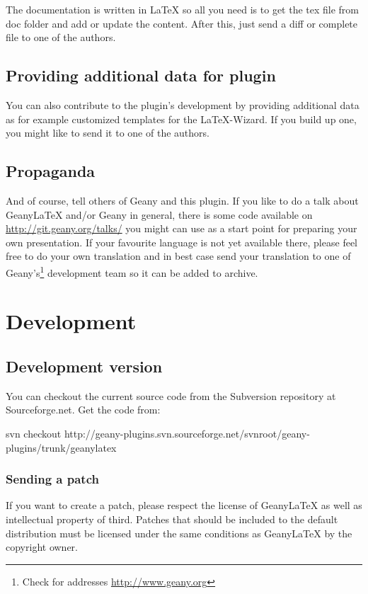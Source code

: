 \documentclass[%
paper=a4,%
fontsize=11pt,%
twoside=false,%
DIV18,
headsepline,
plainheadsepline,
footsepline,
plainfootsepline,
bibliography=totoc,%
listof=totoc,%
BCOR10mm,%
parskip=half,%
openany,%
]{scrartcl}
\begin{document}
The documentation is written in \LaTeX{} so all you need is to get the
tex file from doc folder and add or update the content.
After this, just send a diff or complete file to one of the authors.


\subsection{Providing additional data for plugin}

You can also contribute to the plugin's development by providing
additional data as for example customized templates for the
\LaTeX-Wizard. If you build up one, you might like to send it to
one of the authors.

\subsection{Propaganda}
And of course, tell others of Geany and this plugin. If you like to do
a talk about Geany\LaTeX{} and/or Geany in general, there is some code
available on \url{http://git.geany.org/talks/} you might can use as a
start point for preparing your own presentation. If your favourite
language is not yet available there, please feel free to do your own
translation and in best case send your translation to one of
Geany's\footnote{Check for addresses \url{http://www.geany.org}}
development team so it can be added to archive.


\section{Development}
\subsection{Development version}
You can checkout the current source code from the Subversion repository
at Sourceforge.net. Get the code from:

svn checkout
http://geany-plugins.svn.sourceforge.net/svnroot/geany-plugins/trunk/geanylatex

\subsubsection{Sending a patch}
\label{sec:sending_a_patch}
If you want to create a patch, please respect the license of
Geany\LaTeX{} as well as intellectual property of third. Patches that
should be included to the default distribution must be licensed under
the same conditions as Geany\LaTeX{} by the copyright owner.
\end{document}
